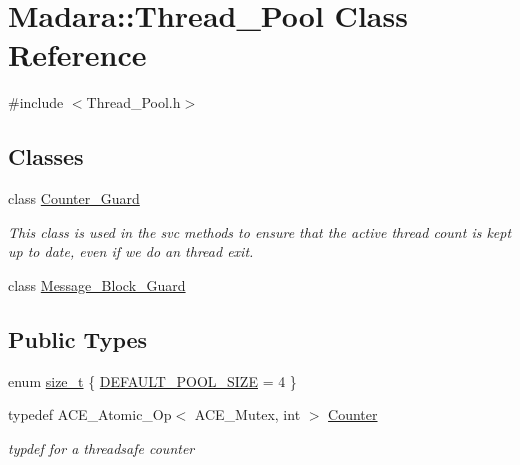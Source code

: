 \hypertarget{classMadara_1_1Thread__Pool}{
\section{Madara::Thread\_\-Pool Class Reference}
\label{de/de8/classMadara_1_1Thread__Pool}
}


{\ttfamily \#include $<$Thread\_\-Pool.h$>$}

\subsection*{Classes}
\begin{DoxyCompactItemize}
\item 
class \hyperlink{classMadara_1_1Thread__Pool_1_1Counter__Guard}{Counter\_\-Guard}
\begin{DoxyCompactList}\small\item\em This class is used in the svc methods to ensure that the active thread count is kept up to date, even if we do an thread exit. \item\end{DoxyCompactList}\item 
class \hyperlink{classMadara_1_1Thread__Pool_1_1Message__Block__Guard}{Message\_\-Block\_\-Guard}
\end{DoxyCompactItemize}
\subsection*{Public Types}
\begin{DoxyCompactItemize}
\item 
enum \hyperlink{classMadara_1_1Thread__Pool_a3d16063779a0b939db6c3671e7cf7f44}{size\_\-t} \{ \hyperlink{classMadara_1_1Thread__Pool_a3d16063779a0b939db6c3671e7cf7f44ac57ae35d186b494621a65adb253310e5}{DEFAULT\_\-POOL\_\-SIZE} =  4
 \}
\item 
typedef ACE\_\-Atomic\_\-Op$<$ ACE\_\-Mutex, int $>$ \hyperlink{classMadara_1_1Thread__Pool_a301b0deb023c42a89927746f3453218f}{Counter}
\begin{DoxyCompactList}\small\item\em typdef for a threadsafe counter \item\end{DoxyCompactList}\end{DoxyCompactItemize}
